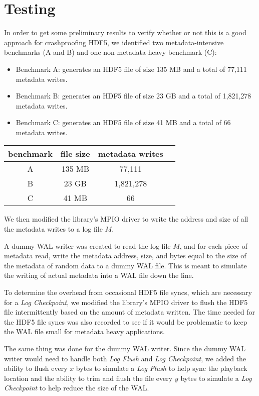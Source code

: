 \section{Testing}
\label{sec:testing}

In order to get some preliminary results to verify whether or not this is a good approach for crashproofing HDF5, we identified two metadata-intensive benchmarks (A and B) and one non-metadata-heavy benchmark (C): 
\begin{itemize}
    \item Benchmark A: generates an HDF5 file of size 135 MB and a total of 77,111 metadata writes.
    \item Benchmark B: generates an HDF5 file of size 23 GB and a total of 1,821,278 metadata writes.
    \item Benchmark C: generates an HDF5 file of size 41 MB and a total of 66 metadata writes.
 \end{itemize}

\begin{center}
\begin{tabular}{|c|c|c|c|}
\hline
   benchmark & file size & metadata writes \\
   \hline
   A  & 135 MB & 77,111 \\
   \hline
   B & 23 GB & 1,821,278\\
   \hline
   C & 41 MB & 66\\
   \hline
\end{tabular}
\end{center}
 
We then modified the library's MPIO driver to write the address and size of all the metadata writes to a log file $M$.

A dummy WAL writer was created to read the log file $M$, and for each piece of metadata read, write the metadata address, size, and bytes equal to the size of the metadata of random data to a dummy WAL file. This is meant to simulate the writing of actual metadata into a WAL file down the line.

To determine the overhead from occasional HDF5 file syncs, which are necessary for a \textit{Log Checkpoint}, we modified the library's MPIO driver to flush the HDF5 file intermittently based on the amount of metadata written. The time needed for the HDF5 file syncs was also recorded to see if it would be problematic to keep the WAL file small for metadata heavy applications.

The same thing was done for the dummy WAL writer. Since the dummy WAL writer would need to handle both \textit{Log Flush }and \textit{Log Checkpoint}, we added the ability to flush every $x$ bytes to simulate a \textit{Log Flush} to help sync the playback location and the ability to trim and flush the file every $y$ bytes to simulate a \textit{Log Checkpoint} to help reduce the size of the WAL.

